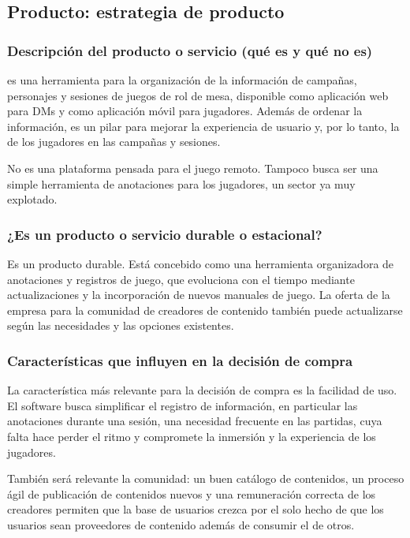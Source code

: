 \subsection{Producto: estrategia de producto}

\subsubsection{Descripción del producto o servicio (qué es y qué no es)}
\nombreproyecto{} es una herramienta para la organización de la información de campañas, personajes y sesiones de juegos de rol de mesa, disponible como aplicación web para DMs y como aplicación móvil para jugadores. Además de ordenar la información, es un pilar para mejorar la experiencia de usuario y, por lo tanto, la de los jugadores en las campañas y sesiones.

No es una plataforma pensada para el juego remoto. Tampoco busca ser una simple herramienta de anotaciones para los jugadores, un sector ya muy explotado.

\subsubsection{¿Es un producto o servicio durable o estacional?}
Es un producto durable. Está concebido como una herramienta organizadora de anotaciones y registros de juego, que evoluciona con el tiempo mediante actualizaciones y la incorporación de nuevos manuales de juego. La oferta de la empresa para la comunidad de creadores de contenido también puede actualizarse según las necesidades y las opciones existentes.

\subsubsection{Características que influyen en la decisión de compra}
La característica más relevante para la decisión de compra es la facilidad de uso. El software busca simplificar el registro de información, en particular las anotaciones durante una sesión, una necesidad frecuente en las partidas, cuya falta hace perder el ritmo y compromete la inmersión y la experiencia de los jugadores.

También será relevante la comunidad: un buen catálogo de contenidos, un proceso ágil de publicación de contenidos nuevos y una remuneración correcta de los creadores permiten que la base de usuarios crezca por el solo hecho de que los usuarios sean proveedores de contenido además de consumir el de otros.


